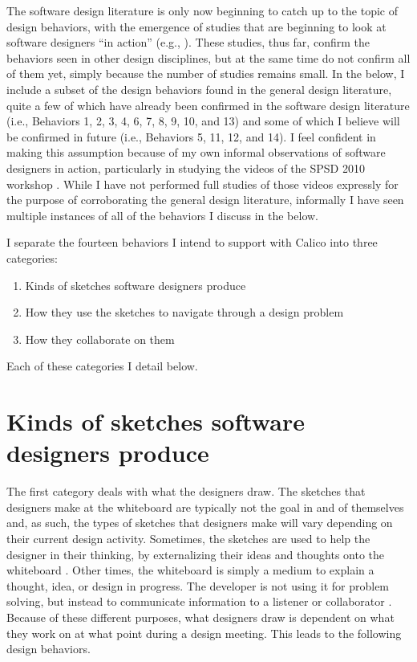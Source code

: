 \documentclass[12pt,fleqn]{ucithesis}
\begin{document}
The software design literature is only now beginning to catch up to the topic of design behaviors, with the emergence of studies that are beginning to look at software designers ``in action'' (e.g., \cite{baker2012guest,cherubini2007let,dekel2007notation,petre2009insights}). These studies, thus far, confirm the behaviors seen in other design disciplines, but at the same time do not confirm all of them yet, simply because the number of studies remains small. In the below, I include a subset of the design behaviors found in the general design literature, quite a few of which have already been confirmed in the software design literature (i.e., Behaviors 1, 2, 3, 4, 6, 7, 8, 9, 10, and 13) and some of which I believe will be confirmed in future (i.e., Behaviors 5, 11, 12, and 14). I feel confident in making this assumption because of my own informal observations of software designers in action, particularly in studying the videos of the SPSD 2010 workshop \cite{baker2012guest}. While I have not performed full studies of those videos expressly for the purpose of corroborating the general design literature, informally I have seen multiple instances of all of the behaviors I discuss in the below. 

I separate the fourteen behaviors I intend to support with Calico into three categories:

 \begin{enumerate}
 \item Kinds of sketches software designers produce
 \item How they use the sketches to navigate through a design problem
 \item How they collaborate on them
 \end{enumerate}

Each of these categories I detail below.

\section{Kinds of sketches software designers produce}
\label{chapter:motivation:kinds}

The first category deals with what the designers draw. The sketches that designers make at the whiteboard are typically not the goal in and of themselves and, as such, the types of sketches that designers make will vary depending on their current design activity. Sometimes, the sketches are used to help the designer in their thinking, by externalizing their ideas and thoughts onto the whiteboard \cite{lawson1994design}. Other times, the whiteboard is simply a medium to explain a thought, idea, or design in progress. The developer is not using it for problem solving, but instead to communicate information to a listener or collaborator \cite{eugene1992engineering}. Because of these different purposes, what designers draw is dependent on what they work on at what point during a design meeting. This leads to the following design behaviors.
\end{document}
